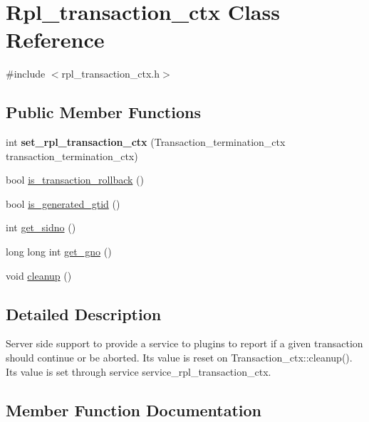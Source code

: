 \hypertarget{classRpl__transaction__ctx}{}\section{Rpl\+\_\+transaction\+\_\+ctx Class Reference}
\label{classRpl__transaction__ctx}


{\ttfamily \#include $<$rpl\+\_\+transaction\+\_\+ctx.\+h$>$}

\subsection*{Public Member Functions}
\begin{DoxyCompactItemize}
\item 
\mbox{\label{classRpl__transaction__ctx_a168393a702d87ac695bdc79b2d125605}} 
int {\bfseries set\+\_\+rpl\+\_\+transaction\+\_\+ctx} (Transaction\+\_\+termination\+\_\+ctx transaction\+\_\+termination\+\_\+ctx)
\item 
bool \mbox{\hyperlink{classRpl__transaction__ctx_a9e0566ffa58a8b7d85339fefc4b1c177}{is\+\_\+transaction\+\_\+rollback}} ()
\item 
bool \mbox{\hyperlink{classRpl__transaction__ctx_a5a71e376fec6821b0b77d92e52810143}{is\+\_\+generated\+\_\+gtid}} ()
\item 
int \mbox{\hyperlink{classRpl__transaction__ctx_aeb35b76ddcd546ceb7ca9b9d8749f499}{get\+\_\+sidno}} ()
\item 
long long int \mbox{\hyperlink{classRpl__transaction__ctx_a7838f13fc5d27de9e6b5ffb9af1b171a}{get\+\_\+gno}} ()
\item 
void \mbox{\hyperlink{classRpl__transaction__ctx_ad75e6281a39901ec05c690441d68ab84}{cleanup}} ()
\end{DoxyCompactItemize}


\subsection{Detailed Description}
Server side support to provide a service to plugins to report if a given transaction should continue or be aborted. Its value is reset on Transaction\+\_\+ctx\+::cleanup(). Its value is set through service service\+\_\+rpl\+\_\+transaction\+\_\+ctx. 

\subsection{Member Function Documentation}
\mbox{\label{classRpl__transaction__ctx_ad75e6281a39901ec05c690441d68ab84}} 
